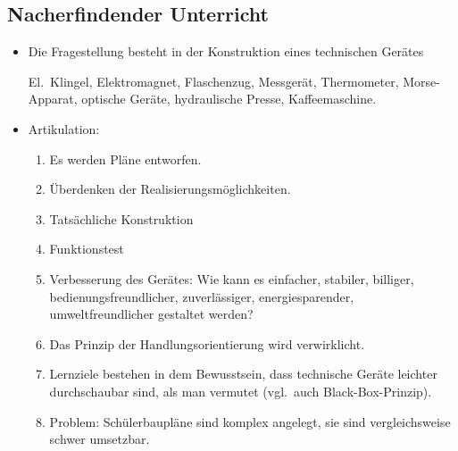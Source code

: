 \subsection{Nacherfindender Unterricht}
\begin{itemize}
\item Die Fragestellung besteht in der Konstruktion eines
technischen Ger\"{a}tes
\begin{beisp2}
	El.\ Klingel, Elektromagnet, Flaschenzug,
Messger\"{a}t, Thermometer, Morse-Apparat, optische Ger\"{a}te,
hydraulische Presse, Kaffeemaschine.
\end{beisp2}

\item Artikulation:
\begin{enumerate}
\item Es werden Pl\"{a}ne entworfen.
\item \"{U}berdenken der Realisierungsm\"{o}glichkeiten.
\item Tats\"{a}chliche Konstruktion
\item Funktionstest
\item Verbesserung des Ger\"{a}tes: Wie kann es einfacher, stabiler,
billiger, bedienungsfreundlicher, zuverl\"{a}ssiger, energiesparender,
umweltfreundlicher gestaltet werden?
\item Das Prinzip der Handlungsorientierung wird verwirklicht.
\item Lernziele bestehen in dem Bewusstsein, dass technische Ger\"{a}te
leichter durchschaubar sind, als man vermutet (vgl.\ auch
Black-Box-Prinzip).
\item Problem: Sch\"{u}lerbaupl\"{a}ne sind komplex angelegt, sie sind
vergleichsweise schwer umsetzbar.
\end{enumerate}
\end{itemize}



